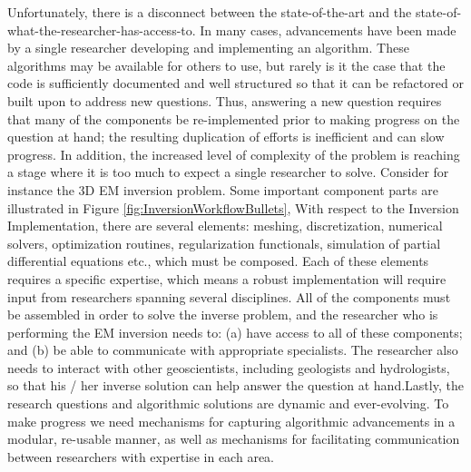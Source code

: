 \documentclass[paper]{geophysics}
\begin{document}
Unfortunately, there is a disconnect between the state-of-the-art and the state-of-what-the-researcher-has-access-to. In many cases, advancements have been made by a single researcher developing and implementing an algorithm. These algorithms may be available for others to use, but rarely is it the case that the code is sufficiently documented and well structured so that it can be refactored or built upon to address new questions. Thus, answering a new question requires that many of the components be re-implemented prior to making progress on the question at hand; the resulting duplication of efforts is inefficient and can slow progress. In addition, the increased level of complexity of the problem is reaching a stage where it is too much to expect a single researcher to solve. Consider for instance the 3D EM inversion problem. Some important component parts are illustrated in Figure \ref{fig:InversionWorkflowBullets}, With respect to the Inversion Implementation, there are several elements: meshing, discretization, numerical solvers, optimization routines, regularization functionals, simulation of partial differential equations etc., which must be composed. Each of these elements requires a specific expertise, which means a robust implementation will require input from researchers spanning several disciplines. All of the components must be assembled in order to solve the inverse problem, and the researcher who is performing the EM inversion needs to: (a) have access to all of these components; and (b) be able to communicate with appropriate specialists. The researcher also needs to interact with other geoscientists, including geologists and hydrologists, so that his / her inverse solution can help answer the question at hand.Lastly,  the research questions and algorithmic solutions are dynamic and ever-evolving. To make progress we need mechanisms for capturing algorithmic advancements in a modular, re-usable manner, as well as mechanisms for facilitating communication between researchers with expertise in each area.



\end{document}
